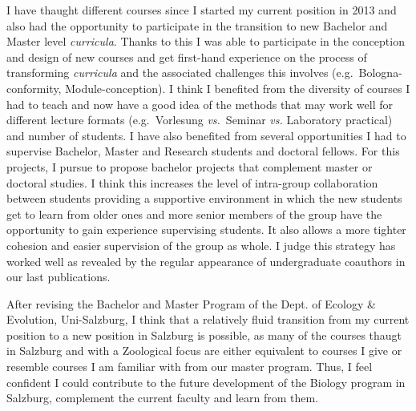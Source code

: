 \documentclass[a4paper,11pt]{article}
\begin{document}
I have thaught different courses since I started my current position in 2013 and also had the opportunity to participate in the transition to new Bachelor and Master level \emph{curricula}. Thanks to this I was able to participate in the conception and design of new courses and get first-hand experience on the process of transforming \emph{curricula} and the associated challenges this involves (e.g.~Bologna-conformity, Module-conception). I think I benefited from the diversity of courses I had to teach and now have a good idea of the methods that may work well for different lecture formats (e.g.~Vorlesung \emph{vs.}~Seminar \emph{vs.} Laboratory practical) and number of students. I have also benefited from several opportunities I had to supervise Bachelor, Master and Research students and doctoral fellows. For this projects, I pursue to propose bachelor projects that complement master or doctoral studies. I think this increases the level of intra-group collaboration between students providing a supportive environment in which the new students get to learn from older ones and more senior members of the group have the opportunity to gain experience supervising students. It also allows a more tighter cohesion and easier supervision of the group as whole. I judge this strategy has worked well as revealed by the regular appearance of undergraduate coauthors in our last publications.

After revising the Bachelor and Master Program of the Dept. of Ecology \& Evolution, Uni-Salzburg, I think that a relatively fluid transition from my current position to a new position in Salzburg is possible, as many of the courses thaugt in Salzburg and with a Zoological focus are either equivalent to courses I give or resemble courses I am familiar with from our master program. Thus, I feel confident I could contribute to the future development of the Biology program in Salzburg, complement the current faculty and learn from them.



\begingroup
\parindent 0pt
\def\enotesize{\footnotesize}
\theendnotes
\endgroup

\end{document}
